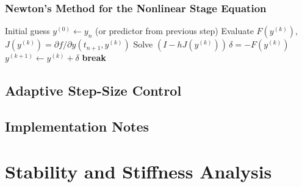 \documentclass[11pt]{article}
\begin{document}
\subsubsection{Newton's Method for the Nonlinear Stage Equation}
\begin{algorithm}[h]
\caption{Newton iteration for one implicit Euler step}
\begin{algorithmic}[1]
\State Initial guess $y^{(0)} \gets y_n$ (or predictor from previous step)
  \State Evaluate $F(y^{(k)})$, $J(y^{(k)}) = \partial f/\partial y (t_{n+1}, y^{(k)})$
  \State Solve $(I - hJ(y^{(k)}))\,\delta = -F(y^{(k)})$
  \State $y^{(k+1)} \gets y^{(k)} + \delta$
   \textbf{break}
  \EndIf
\EndFor
\end{algorithmic}
\end{algorithm}

\subsection{Adaptive Step-Size Control}

\subsection{Implementation Notes}

\section{Stability and Stiffness Analysis}
\end{document}
